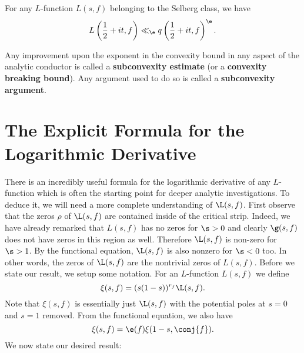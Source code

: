     \begin{conjecture}
      For any $L$-function $L(s,f)$ belonging to the Selberg class, we have
      \[
        L\left(\frac{1}{2}+it,f\right) \ll_{\e} q\left(\frac{1}{2}+it,f\right)^{\e}.
      \]
    \end{conjecture}

    Any improvement upon the exponent in the convexity bound in any aspect of the analytic conductor is called a \textbf{subconvexity estimate} (or a \textbf{convexity breaking bound}). Any argument used to do so is called a \textbf{subconvexity argument}.
  \section{The Explicit Formula for the Logarithmic Derivative}
    There is an incredibly useful formula for the logarithmic derivative of any $L$-function which is often the starting point for deeper analytic investigations. To deduce it, we will need a more complete understanding of $\L(s,f)$. First observe that the zeros $\rho$ of $\L(s,f)$ are contained inside of the critical strip. Indeed, we have already remarked that $L(s,f)$ has no zeros for $\s > 0$ and clearly $\g(s,f)$ does not have zeros in this region as well. Therefore $\L(s,f)$ is non-zero for $\s > 1$. By the functional equation, $\L(s,f)$ is also nonzero for $\s < 0$ too. In other words, the zeros of $\L(s,f)$ are the nontrivial zeros of $L(s,f)$. Before we state our result, we setup some notation. For an $L$-function $L(s,f)$ we define
    \[
      \xi(s,f) = (s(1-s))^{r_{f}}\L(s,f).
    \]
    Note that $\xi(s,f)$ is essentially just $\L(s,f)$ with the potential poles at $s = 0$ and $s = 1$ removed. From the functional equation, we also have
    \[
      \xi(s,f) = \e(f)\xi(1-s,\conj{f}).
    \]
    We now state our desired result:

